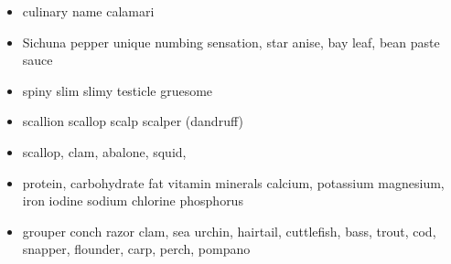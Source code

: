 \documentclass[a4paper,11pt,twoside]{book}
\begin{document}
\begin{itemize}
	\item culinary name calamari 
	
	\item Sichuna pepper unique numbing sensation, star anise, bay leaf, bean paste sauce
	
	\item spiny slim slimy testicle gruesome
	
	\item scallion scallop scalp scalper (dandruff)
	
	\item scallop, clam, abalone, squid,  
	
	\item protein, carbohydrate fat vitamin minerals calcium, potassium magnesium, iron iodine sodium chlorine phosphorus
	
	\item grouper conch razor clam, sea urchin, hairtail, cuttlefish, bass, trout, cod, snapper, flounder, carp, perch, pompano
	
\end{itemize}
\end{document}
